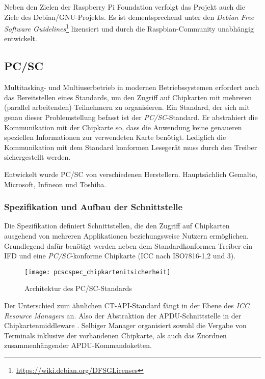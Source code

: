 Neben den Zielen der Raspberry Pi Foundation verfolgt das Projekt
auch die Ziele des Debian/GNU-Projekts. Es ist dementsprechend unter
den \textit{Debian Free Software Guidelines}\footnote{\url{https://wiki.debian.org/DFSGLicenses}}
lizensiert und durch die Raspbian-Community unabhängig entwickelt.

\subsection{PC/SC}
Multitasking- und Multiuserbetrieb in modernen Betriebssystemen erfordert
auch das Bereitstellen eines Standards, um den Zugriff auf Chipkarten
mit mehreren (parallel arbeitenden) Teilnehmern zu organisieren. Ein Standard, der sich mit genau
dieser Problemstellung befasst ist der \textit{\ac{PC/SC}}-Standard.
Er abstrahiert die Kommunikation mit der Chipkarte so,
dass die Anwendung keine genaueren speziellen Informationen zur verwendeten
Karte benötigt. Lediglich die Kommunikation mit dem Standard
konformen Lesegerät muss durch den Treiber sichergestellt werden.

Entwickelt wurde PC/SC von verschiedenen Herstellern. Hauptsächlich
Gemalto, Microsoft, Infineon und Toshiba.

\subsubsection{Spezifikation und Aufbau der Schnittstelle}
Die Spezifikation definiert Schnittstellen, die den Zugriff auf Chipkarten ausgehend
von mehreren Applikationen beziehungsweise Nutzern ermöglichen. Grundlegend
dafür benötigt werden neben dem Standardkonformen Treiber ein \ac{IFD} und
eine \textit{PC/SC}-konforme Chipkarte (\ac{ICC} nach ISO7816-1,2 und 3).

 \begin{figure}[htp]
  \begin{center}
   \texttt{[image: pcscspec\_chipkartenitsicherheit]}
  \end{center}
  \caption[Architektur des PC/SC-Standards]{Architektur des PC/SC-Standards \cite{spitz11}}
  \label{abb:architektur_pcsc}
 \end{figure}

Der Unterschied zum ähnlichen CT-API-Standard fängt in der Ebene
des \textit{ICC Resource Managers} an. Also der Abstraktion der
APDU-Schnittstelle in der Chipkartenmiddleware \cite{spitz11}.
Selbiger Manager organisiert sowohl die Vergabe von Terminals inklusive
der vorhandenen Chipkarte, als auch das Zuordnen zusammenhängender
APDU-Kommandoketten.

